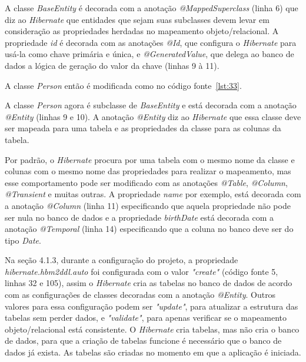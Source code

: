 
A classe \textit{BaseEntity} é decorada com a anotação \textit{@MappedSuperclass} (linha 6) que diz ao \textit{Hibernate} que entidades que sejam suas subclasses devem levar em consideração as propriedades herdadas no mapeamento objeto/relacional. A propriedade \textit{id} é decorada com as anotações \textit{@Id}, que configura o \textit{Hibernate} para usá-la como chave primária e única, e \textit{@GeneratedValue}, que delega ao banco de dados a lógica de geração do valor da chave (linhas 9 à 11).

A classe \textit{Person} então é modificada como no código fonte~\ref{lst:33}.


A classe \textit{Person} agora é subclasse de \textit{BaseEntity} e está decorada com a anotação \textit{@Entity} (linhas 9 e 10). A anotação \textit{@Entity} diz ao \textit{Hibernate} que essa classe deve ser mapeada para uma tabela e as propriedades da classe para as colunas da tabela.

Por padrão, o \textit{Hibernate} procura por uma tabela com o mesmo nome da classe e colunas com o mesmo nome das propriedades para realizar o mapeamento, mas esse comportamento pode ser modificado com as anotações \textit{@Table}, \textit{@Column}, \textit{@Transient} e muitas outras. A propriedade \textit{name} por exemplo, está decorada com a anotação \textit{@Column} (linha 11) especificando que aquela propriedade não pode ser nula no banco de dados e a propriedade \textit{birthDate} está decorada com a anotação \textit{@Temporal} (linha 14) especificando que a coluna no banco deve ser do tipo \textit{Date}.

Na seção 4.1.3, durante a configuração do projeto, a propriedade \textit{hibernate.hbm2ddl.auto} foi configurada com o valor \textit{"create"} (código fonte 5, linhas 32 e 105), assim o \textit{Hibernate} cria as tabelas no banco de dados de acordo com as configurações de classes decoradas com a anotação \textit{@Entity}. Outros valores para essa configuração podem ser \textit{"update"}, para atualizar a estrutura das tabelas sem perder dados, e \textit{"validate"}, para apenas verificar se o mapeamento objeto/relacional está consistente. O \textit{Hibernate} cria tabelas, mas não cria o banco de dados, para que a criação de tabelas funcione é necessário que o banco de dados já exista. As tabelas são criadas no momento em que a aplicação é iniciada.

